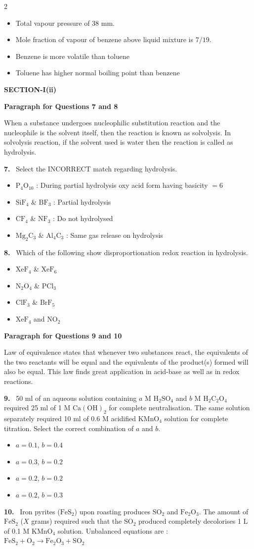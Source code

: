 \documentclass[10pt]{extarticle}
\newcommand{\sect}[1]{\par\smallskip\noindent\textbf{#1}\par}
\newcommand{\qn}[1]{\par\smallskip\noindent\textbf{#1.}~}
\newcommand{\paraq}[2]{\par\smallskip\noindent\textbf{Paragraph for Questions #1 and #2}\par}
\newenvironment{qoptions}{\begin{itemize}[leftmargin=1.8em,itemsep=1pt,topsep=2pt,label={}]}{\end{itemize}}
\newcommand{\opt}[2]{\item[(#1)] #2}
\begin{document}
\begin{multicols}{2}
\begin{qoptions}
\opt{A}{Total vapour pressure of 38 mm.}
\opt{B}{Mole fraction of vapour of benzene above liquid mixture is $7/19$.}
\opt{C}{Benzene is more volatile than toluene}
\opt{D}{Toluene has higher normal boiling point than benzene}
\end{qoptions}
\sect{SECTION-I(ii)}
\paraq{7}{8}
When a substance undergoes nucleophilic substitution reaction and the nucleophile is the solvent itself, then the reaction is known as solvolysis. In solvolysis reaction, if the solvent used is water then the reaction is called as hydrolysis.
\qn{7} Select the INCORRECT match regarding hydrolysis.
\begin{qoptions}
\opt{A}{$\mathrm{P_4O_{10}}$ : During partial hydrolysis oxy acid form having basicity $=6$}
\opt{B}{$\mathrm{SiF_4}$ \& $\mathrm{BF_3}$ : Partial hydrolysis}
\opt{C}{$\mathrm{CF_4}$ \& $\mathrm{NF_3}$ : Do not hydrolysed}
\opt{D}{$\mathrm{Mg_2C_3}$ \& $\mathrm{Al_4C_3}$ : Same gas release on hydrolysis}
\end{qoptions}
\qn{8} Which of the following show disproportionation redox reaction in hydrolysis.
\begin{qoptions}
\opt{A}{$\mathrm{XeF_4}$ \& $\mathrm{XeF_6}$}
\opt{B}{$\mathrm{N_2O_4}$ \& $\mathrm{PCl_3}$}
\opt{C}{$\mathrm{ClF_3}$ \& $\mathrm{BrF_5}$}
\opt{D}{$\mathrm{XeF_4}$ and $\mathrm{NO_2}$}
\end{qoptions}
\paraq{9}{10}
Law of equivalence states that whenever two substances react, the equivalents of the two reactants will be equal and the equivalents of the product(s) formed will also be equal. This law finds great application in acid-base as well as in redox reactions.
\qn{9} 50 ml of an aqueous solution containing $a$ M $\mathrm{H_2SO_4}$ and $b$ M $\mathrm{H_2C_2O_4}$ required 25 ml of 1 M $\mathrm{Ca(OH)_2}$ for complete neutralisation. The same solution separately required 10 ml of 0.6 M acidified $\mathrm{KMnO_4}$ solution for complete titration. Select the correct combination of $a$ and $b$.
\begin{qoptions}
\opt{A}{$a=0.1$, $b=0.4$}
\opt{B}{$a=0.3$, $b=0.2$}
\opt{C}{$a=0.2$, $b=0.2$}
\opt{D}{$a=0.2$, $b=0.3$}
\end{qoptions}
\qn{10} Iron pyrites ($\mathrm{FeS_2}$) upon roasting produces $\mathrm{SO_2}$ and $\mathrm{Fe_2O_3}$. The amount of $\mathrm{FeS_2}$ ($X$ grams) required such that the $\mathrm{SO_2}$ produced completely decolorises 1 L of 0.1 M $\mathrm{KMnO_4}$ solution. Unbalanced equations are :\\
$\mathrm{FeS_2+O_2\to Fe_2O_3+SO_2}$\\

\end{multicols}
\end{document}
